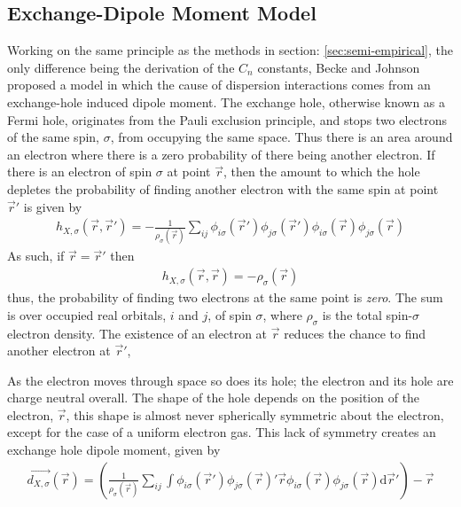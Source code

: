 \documentclass[10pt,a4paper,twocolumn,twoside]{extarticle}
\renewcommand{\d}{\text{d}}
\begin{document}
	\subsection{Exchange-Dipole Moment Model}
	\label{sec:XDM}
	Working on the same principle as the methods in section: \ref{sec:semi-empirical}, the only difference being the derivation of the $C_n$ constants, Becke and Johnson proposed a model\cite{XDM-Original} in which the cause of dispersion interactions comes from an exchange-hole induced dipole moment.\cite{XDM-dipole,XDM-HF,XDM-HigherOrder} The exchange hole, otherwise known as a Fermi hole, originates from the Pauli exclusion principle, and stops two electrons of the same spin, $\sigma$, from occupying the same space. Thus there is an area around an electron where there is a zero probability of there being another electron. If there is an electron of spin $\sigma$ at point $\vec{r}$, then the amount to which the hole depletes the probability of finding another electron with the same spin at point $\vec{r}'$ is given by 
	\begin{align}
		h_{X,\sigma}(\vec{r},\vec{r}') = -\frac{1}{\rho_\sigma(\vec{r})} \sum_{ij} 
										\phi_{i\sigma}(\vec{r}') \phi_{j\sigma}(\vec{r}')
										\phi_{i\sigma}(\vec{r}) \phi_{j\sigma}(\vec{r}) 
	\end{align}
	As such, if $\vec{r} = \vec{r}'$ then 
	\begin{align}
		h_{X,\sigma}(\vec{r}, \vec{r}) = -\rho_\sigma(\vec{r})
	\end{align}
	thus, the probability of finding two electrons at the same point is \emph{zero}.
	The sum is over occupied real orbitals, $i$ and $j$, of spin $\sigma$, where $\rho_\sigma$ is the total spin-$\sigma$ electron density. The existence of an electron at $\vec{r}$ reduces the chance to find another electron at $\vec{r}'$, 

	As the electron moves through space so does its hole; the electron and its hole are charge neutral overall. 
	The shape of the hole depends on the position of the electron, $\vec{r}$, this shape is almost never spherically symmetric about the electron, except for the case of a uniform electron gas. This lack of symmetry creates an exchange hole dipole moment, given by 
	\footnotesize
	\begin{align}
		\label{eq:exchange-dipole}
		\vec{d_{X,\sigma}}(\vec{r}) = \left( \frac{1}{\rho_\sigma(\vec{r})} \sum_{ij}\int
									 \phi_{i\sigma}(\vec{r}') \phi_{j\sigma}(\vec{r})' 
									 \vec{r}\phi_{i\sigma}(\vec{r}) \phi_{j\sigma}(\vec{r}) 
									 \d\vec{r}'\right) - \vec{r}
	\end{align}
	\normalsize
\end{document}
